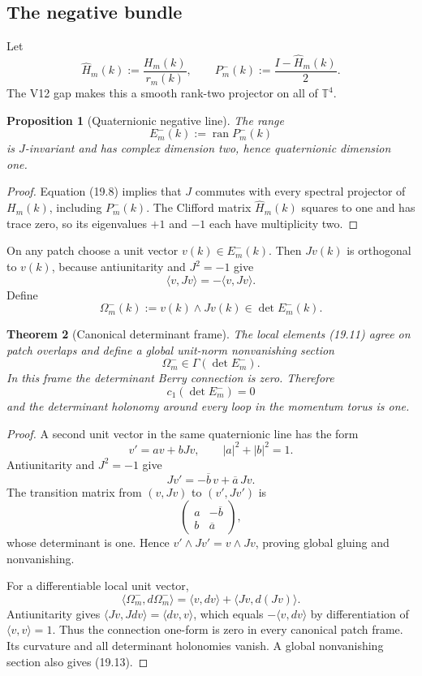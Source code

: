 \documentclass[11pt]{article}
\newtheorem{theorem}{Theorem}[section]
\newtheorem{proposition}[theorem]{Proposition}
\begin{document}
\subsection{The negative bundle}

Let
\[
 \widehat H_m(k):=\frac{H_m(k)}{r_m(k)},
 \qquad
 P_m^-(k):=\frac{I-\widehat H_m(k)}2.
 \tag{19.9}
\]
The V12 gap makes this a smooth rank-two projector on all of
\(\mathbb T^4\).

\begin{proposition}[Quaternionic negative line]
\label{prop:v11v19-negative}
The range
\[
 E_m^-(k):=\operatorname{ran}P_m^-(k)
 \tag{19.10}
\]
is \(J\)-invariant and has complex dimension two, hence quaternionic
dimension one.
\end{proposition}

\begin{proof}
Equation (19.8) implies that \(J\) commutes with every spectral projector
of \(H_m(k)\), including \(P_m^-(k)\).  The Clifford matrix
\(\widehat H_m(k)\) squares to one and has trace zero, so its eigenvalues
\(+1\) and \(-1\) each have multiplicity two.
\end{proof}

On any patch choose a unit vector \(v(k)\in E_m^-(k)\).  Then
\(Jv(k)\) is orthogonal to \(v(k)\), because antiunitarity and \(J^2=-1\)
give
\[
 \langle v,Jv\rangle
 =
 -\langle v,Jv\rangle.
\]
Define
\[
 \Omega_m^-(k):=v(k)\wedge Jv(k)
 \in\det E_m^-(k).
 \tag{19.11}
\]

\begin{theorem}[Canonical determinant frame]
\label{thm:v11v19-canonical-frame}
The local elements (19.11) agree on patch overlaps and define a global
unit-norm nonvanishing section
\[
 \Omega_m^-\in\Gamma(\det E_m^-).
 \tag{19.12}
\]
In this frame the determinant Berry connection is zero.  Therefore
\[
 c_1(\det E_m^-)=0
 \tag{19.13}
\]
and the determinant holonomy around every loop in the momentum torus is
one.
\end{theorem}

\begin{proof}
A second unit vector in the same quaternionic line has the form
\[
 v'=av+bJv,\qquad |a|^2+|b|^2=1.
\]
Antiunitarity and \(J^2=-1\) give
\[
 Jv'=-\overline b\,v+\overline a\,Jv.
\]
The transition matrix from \((v,Jv)\) to \((v',Jv')\) is
\[
 \begin{pmatrix}
 a&-\overline b\\
 b&\overline a
 \end{pmatrix},
\]
whose determinant is one.  Hence
\(v'\wedge Jv'=v\wedge Jv\), proving global gluing and nonvanishing.

For a differentiable local unit vector,
\[
 \langle\Omega_m^-,d\Omega_m^-\rangle
 =
 \langle v,dv\rangle+\langle Jv,d(Jv)\rangle.
\]
Antiunitarity gives
\(\langle Jv,Jdv\rangle=\langle dv,v\rangle\), which equals
\(-\langle v,dv\rangle\) by differentiation of \(\langle v,v\rangle=1\).
Thus the connection one-form is zero in every canonical patch frame.
Its curvature and all determinant holonomies vanish.  A global
nonvanishing section also gives (19.13).
\end{proof}
\end{document}
